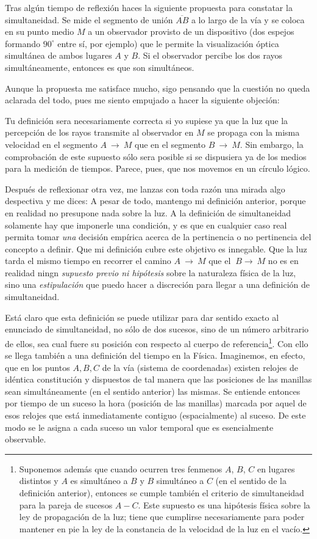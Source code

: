 \documentclass[spanish]{book}
\begin{document}
Tras algún tiempo de reflexión haces la siguiente propuesta para constatar la
simultaneidad. Se mide el segmento de unión $\overline{AB}$ a lo largo de la vía y se coloca en
su punto medio $M$ a un observador provisto de un dispositivo (dos espejos formando
$90^{\circ}$ entre sí, por ejemplo) que le permite la visualización óptica simultánea de ambos
lugares $A$ y $B$. Si el observador percibe los dos rayos simultáneamente, entonces es
que son simultáneos.

Aunque la propuesta me satisface mucho, sigo pensando que la cuestión no queda
aclarada del todo, pues me siento empujado a hacer la siguiente objeción: 

Tu definición sera necesariamente correcta si yo supiese ya que la luz que la
percepción de los rayos transmite al observador en $M$ se propaga con la misma
velocidad en el segmento $A~\longrightarrow~M$ que en el segmento $B~\longrightarrow~M$.
Sin embargo, la comprobación de este supuesto sólo sera posible si se dispusiera ya
de los medios para la medición de tiempos. Parece, pues, que nos movemos en un
círculo lógico.

Después de reflexionar otra vez, me lanzas con toda razón una mirada algo
despectiva y me dices: A pesar de todo, mantengo mi definición anterior, porque en
realidad no presupone nada sobre la luz. A la definición de simultaneidad solamente
hay que imponerle una condición, y es que en cualquier caso real permita tomar \textit{una}
decisión empírica acerca de la pertinencia o no pertinencia del concepto a definir. Que
mi definición cubre este objetivo es innegable. Que la luz tarda el mismo tiempo en
recorrer el camino $A~\longrightarrow~M$ que el $~B\longrightarrow~M$ no es en 
realidad ningn \textit{supuesto previo ni hipótesis} sobre la naturaleza 
física de la luz, sino una \textit{estipulación} que puedo hacer a
discreción para llegar a una definición de simultaneidad.

Está claro que esta definición se puede utilizar para dar sentido exacto al enunciado
de simultaneidad, no sólo de dos sucesos, sino de un número arbitrario de ellos, sea
cual fuere su posición con respecto al cuerpo de referencia\footnote{ Suponemos además
que cuando ocurren tres fenmenos $A$, $B$, $C$ en lugares distintos y $A$ es simultáneo
a $B$ y $B$ simultáneo a $C$ (en el sentido de la definición anterior), entonces se 
cumple también el criterio de simultaneidad para la pareja de sucesos $A-C$. Este supuesto
es una hipótesis física sobre la ley de propagación de la luz; tiene que cumplirse 
necesariamente para poder mantener en pie la ley de la constancia de la velocidad de
la luz en el vacío.}. Con ello se llega también a una definición del tiempo en la Física.
Imaginemos, en efecto, que en los puntos $A, B, C$ de la vía (sistema de coordenadas)
existen relojes de idéntica constitución y dispuestos 
de tal manera que las posiciones de las manillas sean simultáneamente (en el
sentido anterior) las mismas. Se entiende entonces por tiempo de un suceso la hora
(posición de las manillas) marcada por aquel de esos relojes que está inmediatamente
contiguo (espacialmente) al suceso. De este modo se le asigna a cada suceso un valor
temporal que es esencialmente observable.
\end{document}

